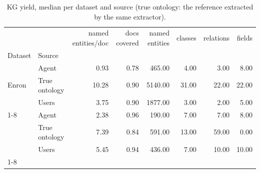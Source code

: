\begin{table}
\caption{KG yield, median per dataset and source (true ontology: the reference extracted by the same extractor).}
\label{tab:onto_kg_yield}
\begin{tabular}{llrrrrrr}
\toprule
 &  & named entities/doc & docs covered & named entities & classes & relations & fields \\
Dataset & Source &  &  &  &  &  &  \\
\midrule
\multirow[t]{3}{*}{Enron} & Agent & 0.93 & 0.78 & 465.00 & 4.00 & 3.00 & 8.00 \\
 & True ontology & 10.28 & 0.90 & 5140.00 & 31.00 & 22.00 & 22.00 \\
 & Users & 3.75 & 0.90 & 1877.00 & 3.00 & 2.00 & 5.00 \\
\cline{1-8}
\multirow[t]{3}{*}{GutBrainIE} & Agent & 2.38 & 0.96 & 190.00 & 7.00 & 7.00 & 8.00 \\
 & True ontology & 7.39 & 0.84 & 591.00 & 13.00 & 59.00 & 0.00 \\
 & Users & 5.45 & 0.94 & 436.00 & 7.00 & 10.00 & 10.00 \\
\cline{1-8}
\bottomrule
\end{tabular}
\end{table}
